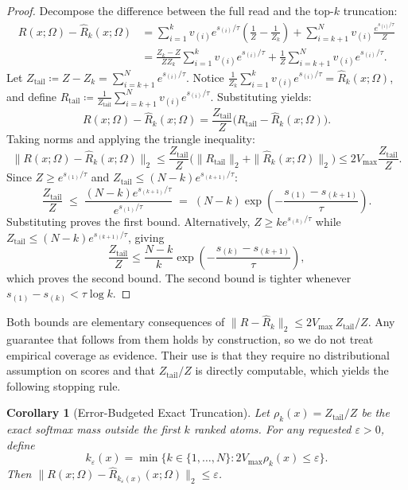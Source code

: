 \documentclass[preprint,12pt]{elsarticle}
\newtheorem{corollary}{Corollary}
\newcommand{\Om}{\Omega}
\begin{document}
\begin{proof}
Decompose the difference between the full read and the top-$k$ truncation:
\begin{align*}
  R(x; \Om) - \hat{R}_k(x; \Om) 
  &= \sum_{i=1}^k v_{(i)} e^{s_{(i)}/\tau} \left( \frac{1}{Z} - \frac{1}{Z_k} \right) + \sum_{i=k+1}^N v_{(i)} \frac{e^{s_{(i)}/\tau}}{Z} \\
  &= \frac{Z_k - Z}{Z Z_k} \sum_{i=1}^k v_{(i)} e^{s_{(i)}/\tau} + \frac{1}{Z} \sum_{i=k+1}^N v_{(i)} e^{s_{(i)}/\tau}.
\end{align*}
Let $Z_{\mathrm{tail}} \coloneqq Z - Z_k = \sum_{i=k+1}^N e^{s_{(i)}/\tau}$. Notice $\frac{1}{Z_k} \sum_{i=1}^k v_{(i)} e^{s_{(i)}/\tau} = \hat{R}_k(x; \Om)$, and define $R_{\mathrm{tail}} \coloneqq \frac{1}{Z_{\mathrm{tail}}} \sum_{i=k+1}^N v_{(i)} e^{s_{(i)}/\tau}$. Substituting yields:
\[
  R(x; \Om) - \hat{R}_k(x; \Om) = \frac{Z_{\mathrm{tail}}}{Z} \big( R_{\mathrm{tail}} - \hat{R}_k(x; \Om) \big).
\]
Taking norms and applying the triangle inequality:
\[
  \| R(x; \Om) - \hat{R}_k(x; \Om) \|_2 
  \le \frac{Z_{\mathrm{tail}}}{Z} \big( \|R_{\mathrm{tail}}\|_2 + \|\hat{R}_k(x; \Om)\|_2 \big) 
  \le 2 V_{\max} \frac{Z_{\mathrm{tail}}}{Z}.
\]
Since $Z \ge e^{s_{(1)}/\tau}$ and $Z_{\mathrm{tail}} \le (N - k) e^{s_{(k+1)}/\tau}$:
\[
  \frac{Z_{\mathrm{tail}}}{Z} \;\le\; \frac{(N - k) e^{s_{(k+1)}/\tau}}{e^{s_{(1)}/\tau}} \;=\; (N - k) \exp\left( -\frac{s_{(1)} - s_{(k+1)}}{\tau} \right).
\]
Substituting proves the first bound. Alternatively, $Z \ge k e^{s_{(k)}/\tau}$ while $Z_{\mathrm{tail}} \le (N-k) e^{s_{(k+1)}/\tau}$, giving
\[
  \frac{Z_{\mathrm{tail}}}{Z} \le \frac{N-k}{k}\exp\left(-\frac{s_{(k)}-s_{(k+1)}}{\tau}\right),
\]
which proves the second bound. The second bound is tighter whenever $s_{(1)} - s_{(k)} < \tau \log k$.
\end{proof}

Both bounds are elementary consequences of $\|R-\hat R_k\|_2 \le 2V_{\max}\,Z_{\mathrm{tail}}/Z$. Any guarantee that follows from them holds by construction, so we do not treat empirical coverage as evidence. Their use is that they require no distributional assumption on scores and that $Z_{\mathrm{tail}}/Z$ is directly computable, which yields the following stopping rule.

\begin{corollary}[Error-Budgeted Exact Truncation]
\label{cor:adaptive_k}
Let $\rho_k(x) = Z_{\mathrm{tail}}/Z$ be the exact softmax mass outside the first $k$ ranked atoms. For any requested $\varepsilon > 0$, define
\[
  k_\varepsilon(x) = \min\{k \in \{1,\dots,N\} : 2 V_{\max} \rho_k(x) \le \varepsilon\}.
\]
Then $\|R(x;\Om) - \hat R_{k_\varepsilon(x)}(x;\Om)\|_2 \le \varepsilon$.
\end{corollary}
\end{document}

